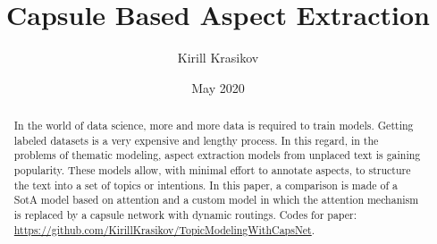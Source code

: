 \documentclass{article}
\title{Capsule Based Aspect Extraction}
\author{Kirill Krasikov}
\date{May 2020}
\begin{document}
\maketitle
\begin{abstract}
    In the world of data science, more and more data is required to train models. Getting labeled datasets is a very expensive and lengthy process. In this regard, in the problems of thematic modeling, aspect extraction models from unplaced text is gaining popularity. These models allow, with minimal effort to annotate aspects, to structure the text into a set of topics or intentions. In this paper, a comparison is made of a SotA model based on attention and a custom model in which the attention mechanism is replaced by a capsule network with dynamic routings.
    Codes for paper: \url{https://github.com/KirillKrasikov/TopicModelingWithCapsNet}.
\end{abstract}
\end{document}
